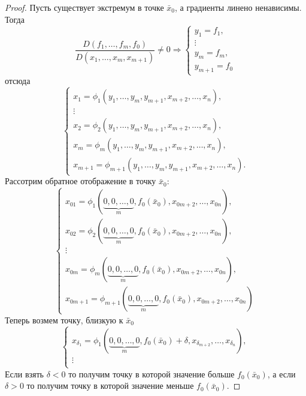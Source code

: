 \begin{proof}
    Пусть существует экстремум в точке $\bar{x}_0$, а градиенты линено ненависимы. Тогда
    \[\frac{D(f_1,\dots,f_m,f_0)}{D(x_1,\dots,x_m,x_{m+1})}\ne 0 \Rightarrow
    \begin{cases}
        y_1=f_1,\\
        \vdots\\
        y_m=f_m,\\
        y_{m+1}=f_0
    \end{cases}    
    \]
    отсюда
    \[\begin{cases}
        x_1=\phi_1(y_1,\dots,y_m,y_{m+1},x_{m+2},\dots,x_n),\\
        \vdots\\
        x_2=\phi_2(y_1,\dots,y_m,y_{m+1},x_{m+2},\dots,x_n),\\
        x_m=\phi_m(y_1,\dots,y_m,y_{m+1},x_{m+2},\dots,x_n),\\
        x_{m+1}=\phi_{m+1}(y_1,\dots,y_m,y_{m+1},x_{m+2},\dots,x_n).
    \end{cases}\]
    Рассотрим обратное отображение в точку $\bar{x}_0$:
    \[\begin{cases}
        x_{01}=\phi_1(\underbrace{0,0,\dots,0}_m,f_0(\bar{x}_0), x_{0m+2}, \dots, x_{0n}),\\ %
        x_{02}=\phi_2(\underbrace{0,0,\dots,0}_m,f_0(\bar{x}_0), x_{0m+2}, \dots, x_{0n}),\\
        \vdots\\
        x_{0m}=\phi_{m}(\underbrace{0,0,\dots,0}_m,f_0(\bar{x}_0), x_{0m+2}, \dots, x_{0n}),\\
        x_{0m+1}=\phi_{m+1}(\underbrace{0,0,\dots,0}_m,f_0(\bar{x}_0), x_{0m+2}, \dots, x_{0n})
    \end{cases}
    \]
    Теперь возмем точку, близкую к $\bar{x}_0$
    \[
    \begin{cases}
        x_{\delta_1}=\phi_1(\underbrace{0,0,\dots,0}_m,f_0(\bar{x}_0)+\delta,x_{\delta_{m+2}},\dots,x_{\delta_n}),\\
        \vdots\\

    \end{cases}
    \]
    Если взять $\delta<0$ то получим точку в которой значение больше $f_0(\bar{x}_0)$, а если $\delta>0$ то получим точку в которой значение меньше $f_0(\bar{x}_0)$.
\end{proof} 
